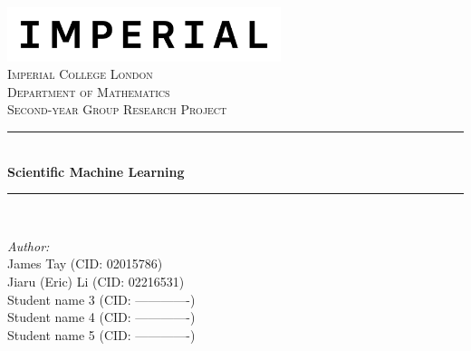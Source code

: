 \documentclass[a4paper,11pt, titlepage]{article}
\theoremstyle{definition}
\theoremstyle{plain}
\theoremstyle{remark}
\newcommand{\reporttitle}{Scientific Machine Learning} %
\newcommand{\reportauthorA}{James Tay (CID: 02015786)} %
\newcommand{\reportauthorB}{Jiaru (Eric) Li (CID: 02216531)} %
\newcommand{\reportauthorC}{Student name 3 (CID: -------------)} %
\newcommand{\reportauthorD}{Student name 4 (CID: -------------)} %
\newcommand{\reportauthorE}{Student name 5 (CID: -------------)} %
\begin{document}
\begin{titlepage}
\newcommand{\HRule}{\rule{\linewidth}{0.5mm}} %
\includegraphics[width=8cm]{Imperial_logo.png}\\[1cm] %
\center %
\textsc{\LARGE Imperial College London}\\[0.5cm] 
\textsc{\Large Department of Mathematics}\\[1.5cm] 
\textsc{\Large Second-year Group Research Project}\\[0.5cm]
\makeatletter
\HRule \\[0.6cm]
{ \huge \bfseries \reporttitle}\\[0.6cm] %
\HRule \\[1.5cm]
\begin{minipage}{0.4\textwidth}
\begin{flushleft} \large
\emph{Author:}\\
\reportauthorA \\
\reportauthorB \\
\reportauthorC \\
\reportauthorD \\
\reportauthorE
\end{flushleft}

\end{minipage}
\end{titlepage}
\end{document}
